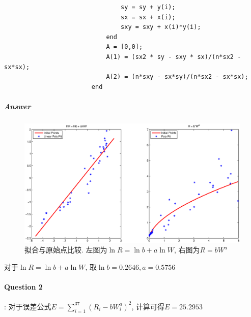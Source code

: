 \documentclass{article}
\begin{document}
\begin{CJK*}{UTF8}{song}
\begin{lstlisting}
								sy = sy + y(i);
								sx = sx + x(i);
								sxy = sxy + x(i)*y(i);
							end
							A = [0,0];
							A(1) = (sx2 * sy - sxy * sx)/(n*sx2 - sx*sx);
							A(2) = (n*sxy - sx*sy)/(n*sx2 - sx*sx);
						end
					\end{lstlisting}
				\subparagraph{Answer}
					\begin{figure}[H]
						\centering
						\includegraphics[width=1.0\textwidth]{../chapter_8_1.eps}
						\caption{拟合与原始点比较. 左图为$\ln R = \ln b + a \ln W$, 右图为$R = bW^a$}
						\label{img_chapter8_1}
					\end{figure}
					对于$\ln R = \ln b + a\ln W$,
					取$\ln b = 0.2646, a = 0.5756$   
				
			\paragraph{Question 2}:\newline
				对于误差公式$E = \sum\limits_{i=1}^{37}\left( R_i - bW_i^a\right)^2$, 计算可得$E = 25.2953$

\end{CJK*}
\end{document}
